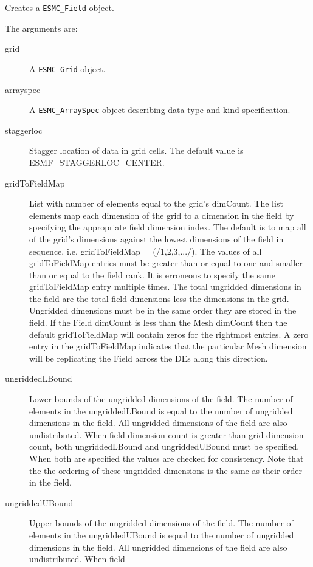   
    Creates a {\tt ESMC\_Field} object.
  
    The arguments are:
    \begin{description}
    \item[grid]
      A {\tt ESMC\_Grid} object.
    \item[arrayspec]
      A {\tt ESMC\_ArraySpec} object describing data type and kind specification.
    \item[staggerloc]
      Stagger location of data in grid cells. The default value is 
      ESMF\_STAGGERLOC\_CENTER.
    \item[gridToFieldMap]
      List with number of elements equal to the grid's dimCount. The list
      elements map each dimension of the grid to a dimension in the field by
      specifying the appropriate field dimension index. The default is to map all of
      the grid's dimensions against the lowest dimensions of the field in sequence,
      i.e. gridToFieldMap = (/1,2,3,.../). The values of all gridToFieldMap entries
      must be greater than or equal to one and smaller than or equal to the field
      rank. It is erroneous to specify the same gridToFieldMap entry multiple times.
      The total ungridded dimensions in the field  are the total field dimensions
      less the dimensions in the grid. Ungridded dimensions must be in the same order
      they are stored in the field. If the Field dimCount is less than the Mesh
      dimCount then the default gridToFieldMap will contain zeros for the rightmost
      entries. A zero entry in the gridToFieldMap indicates that the particular Mesh
      dimension will be replicating the Field across the DEs along this direction.
    \item[ungriddedLBound]
      Lower bounds of the ungridded dimensions of the field. The number of elements
      in the ungriddedLBound is equal to the number of ungridded dimensions in the
      field. All ungridded dimensions of the field are also undistributed. When field
      dimension count is greater than grid dimension count, both ungriddedLBound and
      ungriddedUBound must be specified. When both are specified the values are
      checked for consistency. Note that the the ordering of these ungridded
      dimensions is the same as their order in the field.  
    \item[ungriddedUBound]
      Upper bounds of the ungridded dimensions of the field. The number of elements
      in the ungriddedUBound is equal to the number of ungridded dimensions in the
      field. All ungridded dimensions of the field are also undistributed. When field

\end{description}
